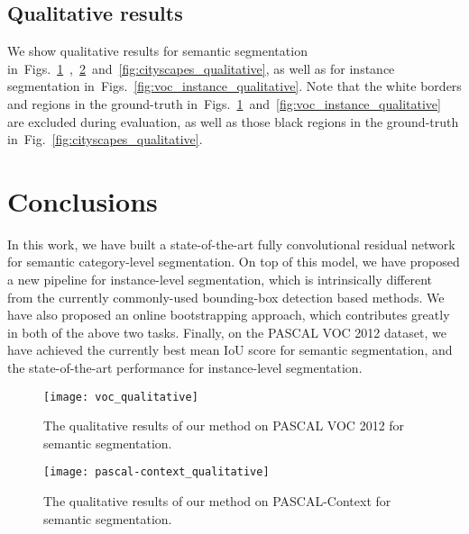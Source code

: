 \documentclass{article}
\begin{document}
\subsection{Qualitative results}

We show qualitative results for semantic segmentation in~Figs.~\ref{fig:voc_qualitative}~,~\ref{fig:pascal-context_qualitative}~and~\ref{fig:cityscapes_qualitative}, as well as for instance segmentation in~Figs.~\ref{fig:voc_instance_qualitative}.
Note that the white borders and regions in the ground-truth in~Figs.~\ref{fig:voc_qualitative}~and~\ref{fig:voc_instance_qualitative} are excluded during evaluation,
as well as those black regions in the ground-truth in~Fig.~\ref{fig:cityscapes_qualitative}.













\section{Conclusions}


In this work, we have built a state-of-the-art fully convolutional residual network for semantic category-level
segmentation.
 On top of this model,
we have proposed a new pipeline for instance-level segmentation,
which is intrinsically different from  the currently commonly-used bounding-box detection based methods.
We have also proposed an online bootstrapping approach, which contributes greatly in both of the above two tasks.
Finally, on the PASCAL VOC 2012 dataset, we have achieved the currently best mean IoU score for semantic segmentation,
and the state-of-the-art performance for instance-level segmentation.


\newpage

\begin{figure}[t!]
\centering
\texttt{[image: voc\_qualitative]}
\caption{The qualitative results of our method on PASCAL VOC 2012 for semantic segmentation.}
\label{fig:voc_qualitative}
\end{figure}

\begin{figure}[t!]
\centering
\texttt{[image: pascal-context\_qualitative]}
\caption{The qualitative results of our method on PASCAL-Context for semantic segmentation.}
\label{fig:pascal-context_qualitative}
\end{figure}
\end{document}

